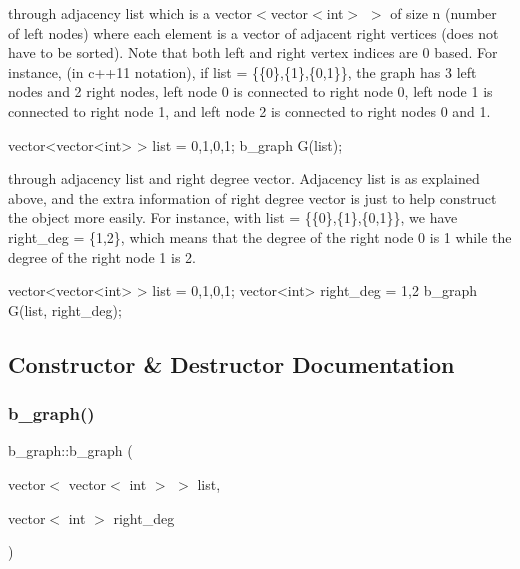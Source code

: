 \begin{DoxyEnumerate}
\item through adjacency list which is a vector$<$vector$<$int$>$ $>$ of size n (number of left nodes) where each element is a vector of adjacent right vertices (does not have to be sorted). Note that both left and right vertex indices are 0 based. For instance, (in c++11 notation), if list = \{\{0\},\{1\},\{0,1\}\}, the graph has 3 left nodes and 2 right nodes, left node 0 is connected to right node 0, left node 1 is connected to right node 1, and left node 2 is connected to right nodes 0 and 1. \begin{DoxyVerb}vector<vector<int> > list = {{0},{1},{0,1}};
b_graph G(list);
\end{DoxyVerb}

\item through adjacency list and right degree vector. Adjacency list is as explained above, and the extra information of right degree vector is just to help construct the object more easily. For instance, with list = \{\{0\},\{1\},\{0,1\}\}, we have right\+\_\+deg = \{1,2\}, which means that the degree of the right node 0 is 1 while the degree of the right node 1 is 2. \begin{DoxyVerb}vector<vector<int> > list = {{0},{1},{0,1}};
vector<int> right_deg = {1,2}
b_graph G(list, right_deg);\end{DoxyVerb}
 
\end{DoxyEnumerate}

\subsection{Constructor \& Destructor Documentation}
\mbox{\label{classb__graph_a6032fbf9681d275260dd9a8587447e61}} 
\subsubsection{\texorpdfstring{b\+\_\+graph()}{b\_graph()}\hspace{0.1cm}{\footnotesize\ttfamily [1/2]}}
{\footnotesize\ttfamily b\+\_\+graph\+::b\+\_\+graph (\begin{DoxyParamCaption}\item[{vector$<$ vector$<$ int $>$ $>$}]{list,  }\item[{vector$<$ int $>$}]{right\+\_\+deg }\end{DoxyParamCaption})}



